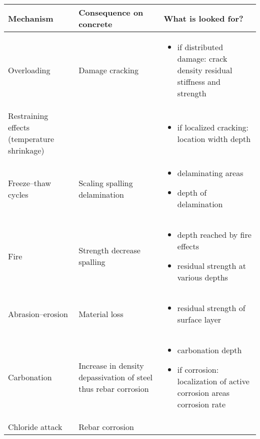 \begin{table}[h!]
\centering
\begin{tabularx}{\textwidth}{|X|X|X|}
\hline
\textbf{Mechanism} & \textbf{Consequence on concrete} & \textbf{What is looked for?} \\
\hline
Overloading & Damage cracking & 
\begin{itemize}[leftmargin=*, nosep, after=\strut]
    \item if distributed damage: crack density residual stiffness and strength
\end{itemize} \\
\hline
Restraining effects (temperature shrinkage) & & 
\begin{itemize}[leftmargin=*, nosep, after=\strut]
    \item if localized cracking: location width depth
\end{itemize} \\
\hline
Freeze–thaw cycles & Scaling spalling delamination & 
\begin{itemize}[leftmargin=*, nosep, after=\strut]
    \item delaminating areas
    \item depth of delamination
\end{itemize} \\
\hline
Fire & Strength decrease spalling & 
\begin{itemize}[leftmargin=*, nosep, after=\strut]
    \item depth reached by fire effects
    \item residual strength at various depths
\end{itemize} \\
\hline
Abrasion–erosion & Material loss & 
\begin{itemize}[leftmargin=*, nosep, after=\strut]
    \item residual strength of surface layer
\end{itemize} \\
\hline
Carbonation & Increase in density depassivation of steel thus rebar corrosion & 
\begin{itemize}[leftmargin=*, nosep, after=\strut]
    \item carbonation depth
    \item if corrosion: localization of active corrosion areas corrosion rate
\end{itemize} \\
\hline
Chloride attack & Rebar corrosion & 
\begin{itemize}[leftmargin=*, nosep, after=\strut]

\end{itemize}
\end{tabularx}
\end{table}
